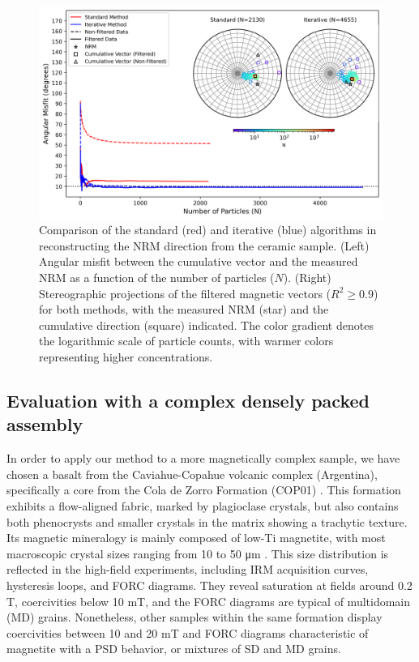 \begin{figure}[tb!]
  \centering
  \includegraphics[width=1\linewidth]{paper/figures/ceramic-data-stereoplot.png}
  \caption{
  Comparison of the standard (red) and iterative (blue) algorithms in reconstructing the NRM direction from the ceramic sample. (Left) Angular misfit between the cumulative vector and the measured NRM as a function of the number of particles ($N$). (Right) Stereographic projections of the filtered magnetic vectors ($R^2 \geq 0.9$) for both methods, with the measured NRM (star) and the cumulative direction (square) indicated. The color gradient denotes the logarithmic scale of particle counts, with warmer colors representing higher concentrations.
  }
  \label{ceramic-data-stereograms}
\end{figure}

\subsection{Evaluation with a complex densely packed assembly}

In order to apply our method to a more magnetically complex sample, we have chosen a basalt from the Caviahue-Copahue volcanic complex (Argentina), specifically a core from the Cola de Zorro Formation (COP01) \citep{Moncinhatto2019}. This formation exhibits a flow-aligned fabric, marked by plagioclase crystals, but also contains both phenocrysts and smaller crystals in the matrix showing a trachytic texture. Its magnetic mineralogy is mainly composed of low-Ti magnetite, with most macroscopic crystal sizes ranging from 10 to 50 \si{\micro\meter} \citep{Moncinhatto2019}. This size distribution is reflected in the high-field experiments, including IRM acquisition curves, hysteresis loops, and FORC diagrams. They reveal saturation at fields around 0.2 \si{T}, coercivities below 10 \si{mT}, and the FORC diagrams are typical of multidomain (MD) grains. Nonetheless, other samples within the same formation display coercivities between 10 and 20 \si{mT} and FORC diagrams characteristic of magnetite with a PSD behavior, or mixtures of SD and MD grains.

